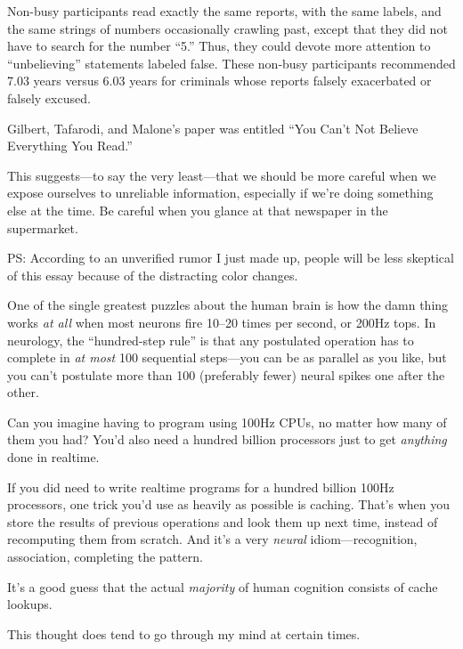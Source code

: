 {
 Non-busy participants read exactly the same reports, with the same
labels, and the same strings of numbers occasionally crawling past,
except that they did not have to search for the number
``5.'' Thus, they could devote more
attention to ``unbelieving''
statements labeled false. These non-busy participants recommended 7.03
years versus 6.03 years for criminals whose reports falsely exacerbated
or falsely excused.}

{
 Gilbert, Tafarodi, and Malone's paper was entitled
``You Can't Not Believe Everything You
Read.''}

{
 This suggests---to say the very least---that we should be more
careful when we expose ourselves to unreliable information, especially
if we're doing something else at the time. Be careful
when you glance at that newspaper in the supermarket.}

{
 PS: According to an unverified rumor I just made up, people will
be less skeptical of this essay because of the distracting color
changes.}

\myendsectiontext


\bigskip


{
 One of the single greatest puzzles about the human brain is how
the damn thing works \textit{at all} when most neurons fire 10--20
times per second, or 200Hz tops. In neurology, the
``hundred-step rule'' is that any
postulated operation has to complete in \textit{at most} 100 sequential
steps---you can be as parallel as you like, but you
can't postulate more than 100 (preferably fewer) neural
spikes one after the other. }

{
 Can you imagine having to program using 100Hz CPUs, no matter how
many of them you had? You'd also need a hundred billion
processors just to get \textit{anything} done in realtime.}

{
 If you did need to write realtime programs for a hundred billion
100Hz processors, one trick you'd use as heavily as
possible is caching. That's when you store the results
of previous operations and look them up next time, instead of
recomputing them from scratch. And it's a very
\textit{neural} idiom---recognition, association, completing the
pattern.}

{
 It's a good guess that the actual
\textit{majority} of human cognition consists of cache lookups.}

{
 This thought does tend to go through my mind at certain times.}

